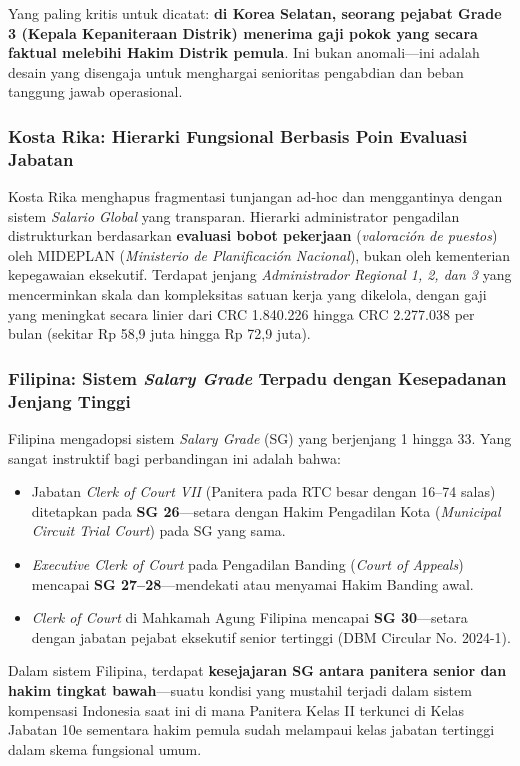 \documentclass[12pt, a4paper]{article}
\begin{document}
Yang paling kritis untuk dicatat: \textbf{di Korea Selatan, seorang pejabat Grade 3 (Kepala Kepaniteraan Distrik) menerima gaji pokok yang secara faktual melebihi Hakim Distrik pemula}. Ini bukan anomali---ini adalah desain yang disengaja untuk menghargai senioritas pengabdian dan beban tanggung jawab operasional.

\subsubsection{Kosta Rika: Hierarki Fungsional Berbasis Poin Evaluasi Jabatan}

Kosta Rika menghapus fragmentasi tunjangan ad-hoc dan menggantinya dengan sistem \textit{Salario Global} yang transparan. Hierarki administrator pengadilan distrukturkan berdasarkan \textbf{evaluasi bobot pekerjaan} (\textit{valoración de puestos}) oleh MIDEPLAN (\textit{Ministerio de Planificación Nacional}), bukan oleh kementerian kepegawaian eksekutif. Terdapat jenjang \textit{Administrador Regional 1, 2, dan 3} yang mencerminkan skala dan kompleksitas satuan kerja yang dikelola, dengan gaji yang meningkat secara linier dari CRC 1.840.226 hingga CRC 2.277.038 per bulan (sekitar Rp 58,9 juta hingga Rp 72,9 juta).

\subsubsection{Filipina: Sistem \textit{Salary Grade} Terpadu dengan Kesepadanan Jenjang Tinggi}

Filipina mengadopsi sistem \textit{Salary Grade} (SG) yang berjenjang 1 hingga 33. Yang sangat instruktif bagi perbandingan ini adalah bahwa:
\begin{itemize}
    \item Jabatan \textit{Clerk of Court VII} (Panitera pada RTC besar dengan 16--74 salas) ditetapkan pada \textbf{SG 26}---setara dengan Hakim Pengadilan Kota (\textit{Municipal Circuit Trial Court}) pada SG yang sama.
    \item \textit{Executive Clerk of Court} pada Pengadilan Banding (\textit{Court of Appeals}) mencapai \textbf{SG 27--28}---mendekati atau menyamai Hakim Banding awal.
    \item \textit{Clerk of Court} di Mahkamah Agung Filipina mencapai \textbf{SG 30}---setara dengan jabatan pejabat eksekutif senior tertinggi (DBM Circular No. 2024-1).
\end{itemize}

Dalam sistem Filipina, terdapat \textbf{kesejajaran SG antara panitera senior dan hakim tingkat bawah}---suatu kondisi yang mustahil terjadi dalam sistem kompensasi Indonesia saat ini di mana Panitera Kelas II terkunci di Kelas Jabatan 10e sementara hakim pemula sudah melampaui kelas jabatan tertinggi dalam skema fungsional umum.
\end{document}
